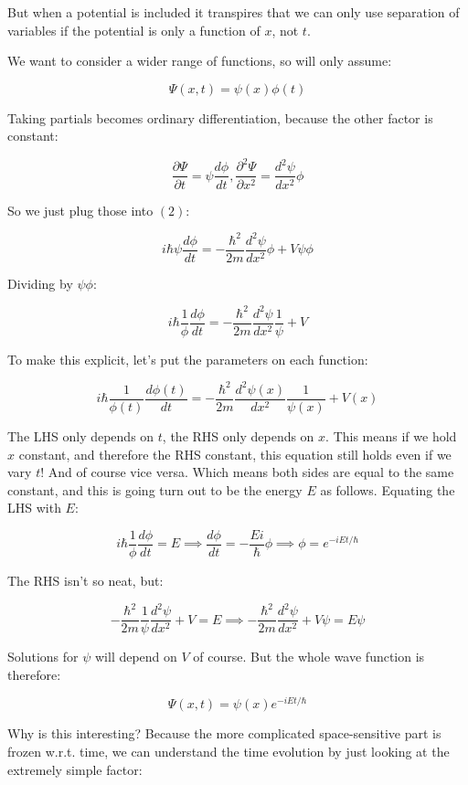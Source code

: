 But when a potential is included it transpires that we can only use separation of variables if the potential is only a function of $x$, not $t$.

We want to consider a wider range of functions, so will only assume:

$$\Psi(x, t) = \psi(x) \phi(t)$$

Taking partials becomes ordinary differentiation, because the other factor is constant:

$$
\frac{\partial \Psi}{\partial t}
= \psi \frac{d \phi}{d t},
\frac{\partial^2 \Psi}{\partial x^2}
= \frac{d^2 \psi}{d x^2}  \phi
$$

So we just plug those into $(2)$:

$$
i\hbar
\psi \frac{d \phi}{d t}
=
- \frac{\hbar^2}{2m}
\frac{d^2 \psi}{d x^2}  \phi
+ V \psi \phi
$$

Dividing by $\psi \phi$:

$$
i\hbar
\frac{1}{\phi}
\frac{d \phi}{d t}
=
- \frac{\hbar^2}{2m}
\frac{d^2 \psi}{d x^2}
\frac{1}{\psi}
+ V
$$

To make this explicit, let's put the parameters on each function:

$$
i\hbar
\frac{1}{\phi(t)}
\frac{d \phi(t)}{d t}
=
- \frac{\hbar^2}{2m}
\frac{d^2 \psi(x)}{d x^2}
\frac{1}{\psi(x)}
+ V(x)
$$

The LHS only depends on $t$, the RHS only depends on $x$. This means if we hold $x$ constant, and therefore the RHS constant, this equation still holds even if we vary $t$! And of course vice versa. Which means both sides are equal to the same constant, and this is going turn out to be the energy $E$ as follows. Equating the LHS with $E$:

$$
i\hbar
\frac{1}{\phi}
\frac{d \phi}{d t}
= E
\implies
\frac{d \phi}{d t}
=
- \frac{Ei}{\hbar}
\phi
\implies
\phi = e^{-iEt/\hbar}
$$

The RHS isn't so neat, but:

$$
- \frac{\hbar^2}{2m}
\frac{1}{\psi}
\frac{d^2 \psi}{d x^2}
+ V
=
E
\implies
- \frac{\hbar^2}{2m}
\frac{d^2 \psi}{d x^2}
+ V\psi
=
E\psi
$$

Solutions for $\psi$ will depend on $V$ of course. But the whole wave function is therefore:

$$\Psi(x, t) = \psi(x) e^{-iEt/\hbar}$$

Why is this interesting? Because the more complicated space-sensitive part is frozen w.r.t. time, we can understand the time evolution by just looking at the extremely simple factor:

